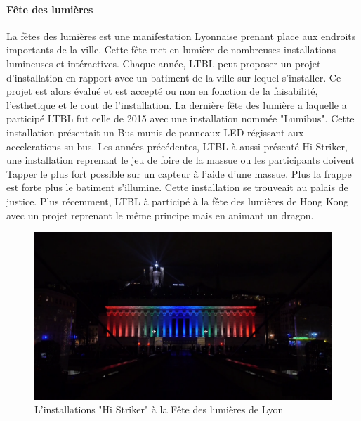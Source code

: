 \documentclass{article}
\begin{document}
\paragraph{Fête des lumières} La fêtes des lumières est une manifestation Lyonnaise prenant place aux endroits importants de la ville.
Cette fête met en lumière de nombreuses installations lumineuses et intéractives.
Chaque année, LTBL peut proposer un projet d'installation en rapport avec un batiment de la ville sur lequel s'installer.
Ce projet est alors évalué et est accepté ou non en fonction de la faisabilité, l'esthetique et le cout de l'installation.
La dernière fête des lumière a laquelle a participé LTBL fut celle de 2015 avec une installation nommée "Lumibus".
Cette installation présentait un Bus munis de panneaux LED régissant aux accelerations su bus.
Les années précédentes, LTBL à aussi présenté Hi Striker, une installation reprenant le jeu de foire de la massue ou les participants doivent Tapper le plus fort possible sur un capteur à l'aide d'une massue.
Plus la frappe est forte plus le batiment s'illumine.
Cette installation se trouveait au palais de justice.
Plus récemment, LTBL à participé à la fête des lumières de Hong Kong avec un projet reprenant le même principe mais en animant un dragon.

\begin{figure}[h]
    \centering
    \includegraphics[scale=0.2]{hi-striker.png}
    \caption{L'installations "Hi Striker" à la Fête des lumières de Lyon}
\end{figure}
\end{document}
